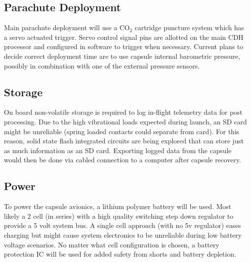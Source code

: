 \documentclass{article}
\begin{document}
\subsection{Parachute Deployment}
Main parachute deployment will use a CO$_2$ cartridge puncture system which has a servo actuated trigger. Servo control signal pins are allotted on the main CDH processor and configured in software to trigger when necessary. Current plans to decide correct deployment time are to use capsule internal barometric pressure, possibly in combination with one of the external pressure sensors.


\subsection{Storage}
On board non-volatile storage is required to log in-flight telemetry data for post processing. Due to the high vibrational loads expected during launch, an SD card might be unreliable (spring loaded contacts could separate from card). For this reason, solid state flash integrated circuits are being explored that can store just as much information as an SD card. Exporting logged data from the capsule would then be done via cabled connection to a computer after capsule recovery.


\subsection{Power}
To power the capsule avionics, a lithium polymer battery will be used. Most likely a 2 cell (in series) with a high quality switching step down regulator to provide a 5 volt system bus. A single cell approach (with no 5v regulator) eases charging but might cause system electronics to be unreliable during low battery voltage scenarios. No matter what cell configuration is chosen, a battery protection IC will be used for added safety from shorts and battery depletion.


\end{document}
